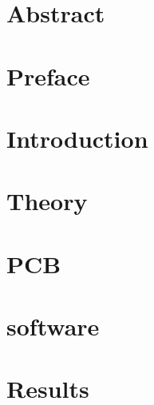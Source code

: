 \documentclass[a4paper]{report}
\begin{document}
\begin{titlepage}

\end{titlepage}

\clearpage
\chapter*{Abstract}


\clearpage
\chapter*{Preface}


\clearpage
\setlength{\columnseprule}{0.2pt}
\tableofcontents %
\vspace{0.5em}

\clearpage
\noindent
\printglossary[type=\acronymtype]
\printglossary[type=main]

\clearpage
\setcounter{page}{2}
\chapter{Introduction}


\clearpage
\chapter{Theory}\label{sec:Theory}


\clearpage
\chapter{PCB}\label{sec:pcb}


\clearpage
\chapter{software}\label{sec:software}


\clearpage
\chapter{Results}\label{sec:results}


\clearpage
\end{document}
